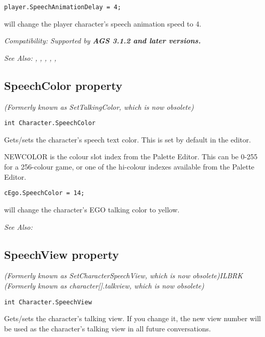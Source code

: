 \begin{verbatim}
player.SpeechAnimationDelay = 4;
\end{verbatim}
will change the player character's speech animation speed to 4.

\it{Compatibility:} Supported by \bf{AGS 3.1.2} and later versions.

\it{See Also:} ,
,
,
,
,


\subsection{SpeechColor property}\label{Character.SpeechColor}%

\it{(Formerly known as SetTalkingColor, which is now obsolete)}

\begin{verbatim}
int Character.SpeechColor
\end{verbatim}
Gets/sets the character's speech text color. This is set by default in the
editor.

NEWCOLOR is the colour slot index from the Palette Editor. This can be 0-255 for
a 256-colour game, or one of the hi-colour indexes available from the Palette Editor.

\begin{verbatim}
cEgo.SpeechColor = 14;
\end{verbatim}
will change the character's EGO talking color to yellow.

\it{See Also:} 


\subsection{SpeechView property}\label{Character.SpeechView}%

\it{(Formerly known as SetCharacterSpeechView, which is now obsolete)}ILBRK
\it{(Formerly known as character[].talkview, which is now obsolete)}

\begin{verbatim}
int Character.SpeechView
\end{verbatim}
Gets/sets the character's talking view. If you change it, the new view number will
be used as the character's talking view in all future conversations.

